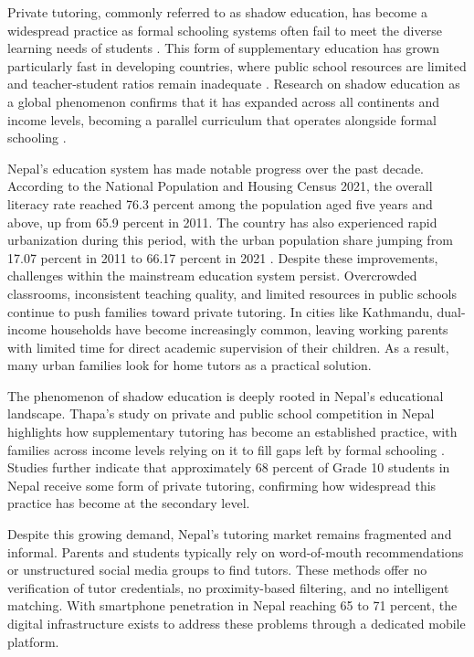 \documentclass[12pt]{report}
\begin{document}
\noindent Private tutoring, commonly referred to as shadow education, has become a widespread practice as formal schooling systems often fail to meet the diverse learning needs of students \citep{bray2007}. This form of supplementary education has grown particularly fast in developing countries, where public school resources are limited and teacher-student ratios remain inadequate \citep{bray2012}. Research on shadow education as a global phenomenon confirms that it has expanded across all continents and income levels, becoming a parallel curriculum that operates alongside formal schooling \citep{kim2019}.

\noindent Nepal's education system has made notable progress over the past decade. According to the National Population and Housing Census 2021, the overall literacy rate reached 76.3 percent among the population aged five years and above, up from 65.9 percent in 2011. The country has also experienced rapid urbanization during this period, with the urban population share jumping from 17.07 percent in 2011 to 66.17 percent in 2021 \citep{cbs2023}. Despite these improvements, challenges within the mainstream education system persist. Overcrowded classrooms, inconsistent teaching quality, and limited resources in public schools continue to push families toward private tutoring. In cities like Kathmandu, dual-income households have become increasingly common, leaving working parents with limited time for direct academic supervision of their children. As a result, many urban families look for home tutors as a practical solution.

\noindent The phenomenon of shadow education is deeply rooted in Nepal's educational landscape. Thapa's study on private and public school competition in Nepal highlights how supplementary tutoring has become an established practice, with families across income levels relying on it to fill gaps left by formal schooling \citep{thapa2013}. Studies further indicate that approximately 68 percent of Grade 10 students in Nepal receive some form of private tutoring, confirming how widespread this practice has become at the secondary level.

\noindent Despite this growing demand, Nepal's tutoring market remains fragmented and informal. Parents and students typically rely on word-of-mouth recommendations or unstructured social media groups to find tutors. These methods offer no verification of tutor credentials, no proximity-based filtering, and no intelligent matching. With smartphone penetration in Nepal reaching 65 to 71 percent, the digital infrastructure exists to address these problems through a dedicated mobile platform.
\end{document}
